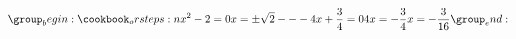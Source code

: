 \documentclass[varwidth, border = 3pt]{standalone}
\begin{document}
\[
\orsteps{
    x^2 - 2 = 0        \\
      x = \pm \sqrt{2}
    ---
    4 x + \dfrac{3}{4} = 0      \\
    4 x = - \dfrac{3}{4}        \\
      x = - \dfrac{3}{16}
}
\]
\end{document}
